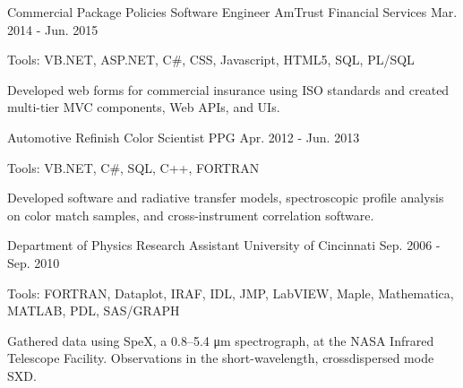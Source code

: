 \begin{cventries}
  \cvexpentry
    {Commercial Package Policies}
    {Software Engineer} %
    {AmTrust Financial Services}
    {Mar. 2014 - Jun. 2015}
    {
      \begin{cvheavyparagraph}
        Tools: VB.NET, ASP.NET, C\#, CSS, Javascript, HTML5, SQL, PL/SQL
      \end{cvheavyparagraph}
    }
    {
      \begin{cvcompactparagraph}
        Developed web forms for commercial insurance using ISO standards and created multi-tier MVC components, Web APIs, and UIs.
      \end{cvcompactparagraph}
    }

  \cvexpentry
    {Automotive Refinish} %
    {Color Scientist} %
    {PPG} %
    {Apr. 2012 - Jun. 2013}
    {
      \begin{cvheavyparagraph}
        Tools: VB.NET, C\#, SQL, C++, FORTRAN
      \end{cvheavyparagraph}
    }
    {
      \begin{cvcompactparagraph}
        Developed software and radiative transfer models, spectroscopic profile analysis on color match samples, and cross-instrument correlation software.
      \end{cvcompactparagraph}
    }

  \cvexpentry
    {Department of Physics}
    {Research Assistant} %
    {University of Cincinnati}
    {Sep. 2006 - Sep. 2010}
   {
     \begin{cvheavyparagraph}
       Tools: FORTRAN, Dataplot, IRAF, IDL, JMP, LabVIEW, Maple, Mathematica, MATLAB, PDL, SAS/GRAPH
     \end{cvheavyparagraph}
   }
    {
      \begin{cvcompactparagraph}
        Gathered data using SpeX, a 0.8–5.4 μm spectrograph, at the NASA Infrared Telescope Facility.  Observations in the short-wavelength, crossdispersed mode SXD.
      \end{cvcompactparagraph}
    }

\end{cventries}
